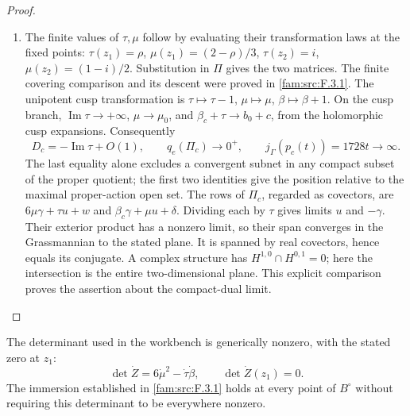 \begin{proof}
\begin{enumerate}[label=\arabic*.,leftmargin=*]
\item The finite values of $\tau,\mu$ follow by evaluating their transformation
laws at the fixed points: $\tau(z_1)=\rho$,
$\mu(z_1)=(2-\rho)/3$, $\tau(z_2)=i$,
$\mu(z_2)=(1-i)/2$.  Substitution in $\Pi$ gives the two matrices.
The finite covering comparison and its descent were proved in \ref{fam:src:F.3.1}.
The unipotent cusp transformation is
$\tau\mapsto\tau-1$, $\mu\mapsto\mu$, $\beta\mapsto\beta+1$.
On the cusp branch, $\operatorname{Im}\tau\to+\infty$,
$\mu\to\mu_0$, and $\beta_c+\tau\to b_0+c$, from the holomorphic
cusp expansions.  Consequently
\[
 D_c=-\operatorname{Im}\tau+O(1),\qquad
 q_e(\Pi_c)\longrightarrow0^+,
 \qquad j_\Gamma(p_c(t))=1728t\longrightarrow\infty.
\]
The last equality alone excludes a convergent subnet in any compact
subset of the proper quotient; the first two identities give the
position relative to the maximal proper-action open set.
The rows of $\Pi_c$, regarded as covectors, are
$6\mu\gamma+\tau u+w$ and $\beta_c\gamma+\mu u+\delta$.
Dividing each by $\tau$ gives limits $u$ and $-\gamma$.
Their exterior product has a nonzero limit, so their span converges
in the Grassmannian to the stated plane.  It is spanned by real
covectors, hence equals its conjugate.  A complex structure has
$H^{1,0}\cap H^{0,1}=0$; here the intersection is the entire
two-dimensional plane.  This explicit comparison proves the assertion
about the compact-dual limit.
\end{enumerate}
\end{proof}

\begin{proposition}\hypertarget{tag-01RG}{}\label{fam:src:F.3.3}\label{fam:st:F.3.3}

The determinant used in the workbench is generically nonzero, with
the stated zero at $z_1$:
\[
 \det\dot Z=6\dot\mu^2-\dot\tau\dot\beta,\qquad
 \det\dot Z(z_1)=0.
\]
The immersion established in \ref{fam:src:F.3.1} holds at every point of $B^\circ$
without requiring this determinant to be everywhere nonzero.
\end{proposition}




